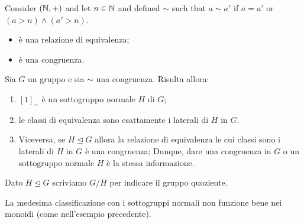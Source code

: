 \documentclass[a4paper]{article}
\begin{document}
\begin{snippetexample}{}
    Consider \((\mathbb{N}, +)\) and let \(n\in \mathbb{N}\)
    and defined \(\sim\) such that \(a\sim a'\) if
    \(a=a'\) or \((a > n) \land (a' > n)\).
    \begin{itemize}
        \item è una relazione di equivalenza;
        \item è una congruenza.
    \end{itemize}
\end{snippetexample}

\begin{snippettheorem}{}
    Sia \(G\) un gruppo e sia \(\sim\) una congruenza.
    Risulta allora:
    \begin{enumerate}
        \item \({[1]}_\sim\) è un sottogruppo normale \(H\) di \(G\);
        \item le classi di equivalenza sono esattamente i laterali di \(H\) in \(G\).
        \item Viceversa, se \(H \unlhd G\) allora la relazione di equivalenza le cui classi sono i laterali di \(H\) in \(G\) è una congruenza;
            Dunque, dare una congruenza in \(G\) o un sottogruppo normale
            \(H\) è la stessa informazione.
    \end{enumerate}
    Dato \(H \unlhd G\) scriviamo \(G/H\) per indicare il gruppo quoziente.
\end{snippettheorem}

La medesima classificazione con i sottogruppi normali non funzione bene nei monoidi (come nell'esempio precedente).
\end{document}
